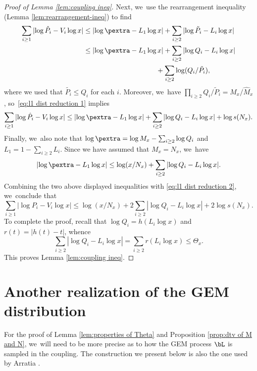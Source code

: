 \begin{proof}[Proof of Lemma \ref{lem:coupling ineq}]
Next, we~use the rearrangement inequality (Lemma \ref{lem:rearrangement-ineq}) to find
\begin{align*}
\sum_{i \ge 1} |{\log \hat P_i - V_i\log x}| &\le |{\log \pextra - L_1\log x}|+ \sum_{i \ge 2} |{\log \tilde P_i - L_i\log x}| \\
&\le |{\log \pextra - L_1\log x}|+ \sum_{i \ge 2} |{\log Q_i - L_i\log x}| \\
&\hspace*{3.7cm} + \sum_{i \ge 2} \log(Q_i/\tilde P_i),
\end{align*}
where we used that $\tilde{P_i}\le Q_i$ for each $i$. Moreover, we~have $\prod_{i \ge 2} Q_i/\tilde P_i = M_x/\hat M_x$, so~\eqref{eq:l1 dist reduction 1} implies
\[
\sum_{i \ge 1} |{\log \hat P_i - V_i\log x}|
\le |{\log \pextra - L_1\log x}|+ \sum_{i \ge 2} |{\log Q_i - L_i\log x}| + \log s(N_x).
\]
Finally, we~also note that $\log \pextra = \log M_x - \sum_{i \ge 2} \log Q_i$ and $L_1 = 1-\sum_{i \ge 2} L_i$. Since we have assumed that $M_x=N_x$, we~have
\[
\label{eq:l1 dist reduction 4}
|{\log \pextra - L_1\log x}| \le \log(x/N_x) + \sum_{i \ge 2} |{\log Q_i - L_i\log x}|.
\]
Combining the two above displayed inequalities with \eqref{eq:l1 dist reduction 2}, we~conclude that
\[
\sum_{i \ge 1} |{\log P_i - V_i\log x}|\le \log(x/N_x) + 2\sum_{i \ge 2} |{\log Q_i - L_i\log x}| + 2\log s(N_x).
\]
To complete the proof, recall that $\log Q_i = h(L_i\log x)$ and $r(t) = |h(t) - t|$, whence
\[
\label{eq:l1 dist reduction 6}
\sum_{i \ge 2} |{\log Q_i - L_i\log x}| = \sum_{i \ge 2} r(L_i\log x) \le \Theta_x.
\]
This proves Lemma \ref{lem:coupling ineq}.
\end{proof}

\section{Another realization of the GEM distribution}
\label{sec:GEM}

For the proof of Lemma \ref{lem:properties of Theta} and Proposition \ref{prop:dtv of M and N}, we~will need to be more precise as to how the GEM process $\bL$ is sampled in the coupling. The construction we present below is also the one used by Arratia \cite{Arratia02}.

